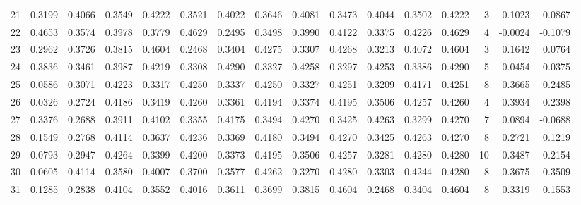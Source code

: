 \begin{tabular}{lrrrrrrrrrrrrrrr}
21  &      0.3199 &  0.4066 &  0.3549 &  0.4222 &  0.3521 &  0.4022 &  0.3646 &  0.4081 &  0.3473 &  0.4044 &   0.3502 &     0.4222 &      3 &                    0.1023 &                     0.0867 \\
22  &      0.4653 &  0.3574 &  0.3978 &  0.3779 &  0.4629 &  0.2495 &  0.3498 &  0.3990 &  0.4122 &  0.3375 &   0.4226 &     0.4629 &      4 &                   -0.0024 &                    -0.1079 \\
23  &      0.2962 &  0.3726 &  0.3815 &  0.4604 &  0.2468 &  0.3404 &  0.4275 &  0.3307 &  0.4268 &  0.3213 &   0.4072 &     0.4604 &      3 &                    0.1642 &                     0.0764 \\
24  &      0.3836 &  0.3461 &  0.3987 &  0.4219 &  0.3308 &  0.4290 &  0.3327 &  0.4258 &  0.3297 &  0.4253 &   0.3386 &     0.4290 &      5 &                    0.0454 &                    -0.0375 \\
25  &      0.0586 &  0.3071 &  0.4223 &  0.3317 &  0.4250 &  0.3337 &  0.4250 &  0.3327 &  0.4251 &  0.3209 &   0.4171 &     0.4251 &      8 &                    0.3665 &                     0.2485 \\
26  &      0.0326 &  0.2724 &  0.4186 &  0.3419 &  0.4260 &  0.3361 &  0.4194 &  0.3374 &  0.4195 &  0.3506 &   0.4257 &     0.4260 &      4 &                    0.3934 &                     0.2398 \\
27  &      0.3376 &  0.2688 &  0.3911 &  0.4102 &  0.3355 &  0.4175 &  0.3494 &  0.4270 &  0.3425 &  0.4263 &   0.3299 &     0.4270 &      7 &                    0.0894 &                    -0.0688 \\
28  &      0.1549 &  0.2768 &  0.4114 &  0.3637 &  0.4236 &  0.3369 &  0.4180 &  0.3494 &  0.4270 &  0.3425 &   0.4263 &     0.4270 &      8 &                    0.2721 &                     0.1219 \\
29  &      0.0793 &  0.2947 &  0.4264 &  0.3399 &  0.4200 &  0.3373 &  0.4195 &  0.3506 &  0.4257 &  0.3281 &   0.4280 &     0.4280 &     10 &                    0.3487 &                     0.2154 \\
30  &      0.0605 &  0.4114 &  0.3580 &  0.4007 &  0.3700 &  0.3577 &  0.4262 &  0.3270 &  0.4280 &  0.3303 &   0.4244 &     0.4280 &      8 &                    0.3675 &                     0.3509 \\
31  &      0.1285 &  0.2838 &  0.4104 &  0.3552 &  0.4016 &  0.3611 &  0.3699 &  0.3815 &  0.4604 &  0.2468 &   0.3404 &     0.4604 &      8 &                    0.3319 &                     0.1553 \\

\end{tabular}
